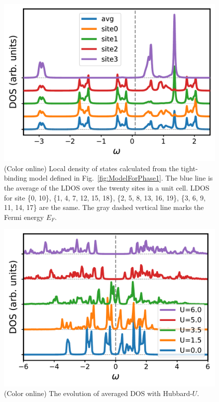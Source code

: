 \documentclass[aps,prb,reprint,amsfonts,amsmath,amssymb,showpacs,groupedaddress,superscriptaddress,onecolumn]{revtex4-1}
\begin{document}
\begin{figure}[p]
    \includegraphics[width=0.8\columnwidth]{TBAForPhase1.pdf}
    \caption{\label{fig:TBAForPhase1} (Color online) Local density of states calculated from the tight-binding model defined in Fig.~\ref{fig:ModelForPhase1}. The blue line is the average of the LDOS over the twenty sites in a unit cell. LDOS for site \{0, 10\}, \{1, 4, 7, 12, 15, 18\}, \{2, 5, 8, 13, 16, 19\}, \{3, 6, 9, 11, 14, 17\} are the same. The gray dashed vertical line marks the Fermi energy $E_{F}$.}
\end{figure}

\begin{figure}[p]
    \includegraphics[width=0.8\columnwidth]{CPTForPhase1.pdf}
    \caption{\label{fig:CPTForPhase1} (Color online) The evolution of averaged DOS with Hubbard-$U$.}
\end{figure}
\end{document}
